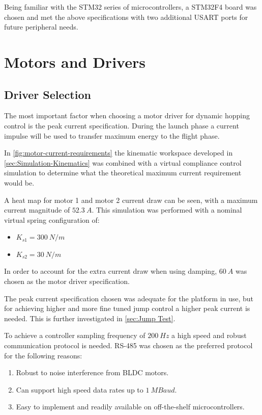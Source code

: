 Being familiar with the STM32 series of microcontrollers, a STM32F4 board was chosen and met the above specifications with two additional USART ports for future peripheral needs.

\section{Motors and Drivers}

\subsection{Driver Selection}
\label{sec:Driver Selection}

The most important factor when choosing a motor driver for dynamic hopping control is the peak current specification. During the launch phase a current impulse will be used to transfer maximum energy to the flight phase. 

In \cref{fig:motor-current-requirements} the kinematic workspace developed in \cref{sec:Simulation-Kinematics} was combined with a virtual compliance control simulation to determine what the theoretical maximum current requirement would be.

A heat map for motor 1 and motor 2 current draw can be seen, with a maximum current magnitude of $52.3\ A$. This simulation was performed with a nominal virtual spring configuration of: 
\begin{itemize}
\item $K_{s1}=300\ N/m$
\item $K_{s2}=30\ N/m$
\end{itemize}
In order to account for the extra current draw when using damping, $60\ A$ was chosen as the motor driver specification. 

The peak current specification chosen was adequate for the platform in use, but for achieving higher and more fine tuned jump control a higher peak current is needed. This is further investigated in \cref{sec:Jump Test}.

To achieve a controller sampling frequency of $200\ Hz$ a high speed and robust communication protocol is needed. RS-485 was chosen as the preferred protocol for the following reasons:
\begin{enumerate}
\item Robust to noise interference from BLDC motors.
\item Can support high speed data rates up to $1\ MBaud$.
\item Easy to implement and readily available on off-the-shelf microcontrollers.
\end{enumerate}


